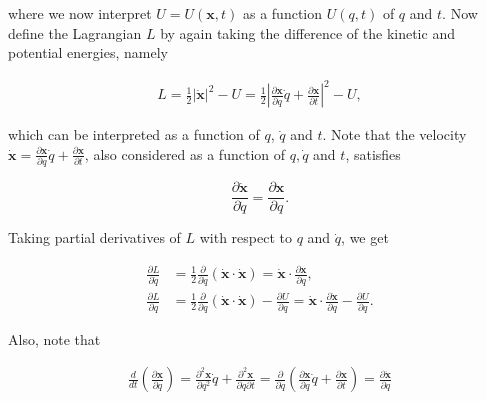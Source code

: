 \documentclass[11pt]{report}
\theoremstyle{plain}
\theoremstyle{definition}
\begin{document}
\noindent where we now interpret $U=U(\mathbf{x},t)$ as a
function $U(q,t)$ of $q$ and $t$. Now define the
Lagrangian $L$ by again taking the difference of the
kinetic and potential energies, namely

\begin{align*}
L = \tfrac12 |\dot{\mathbf{x}}|^2 - U
= \tfrac12 \left| \frac{\partial \mathbf{x}}{\partial q} \dot{q} + \frac{\partial \mathbf{x}}{\partial t} \right|^2 - U,
\end{align*}

\noindent which can be interpreted as a function of $q$,
$\dot{q}$ and $t$. Note that the velocity
$\dot{\mathbf{x}}=\frac{\partial \mathbf{x}}{\partial
q} \dot{q} + \frac{\partial \mathbf{x}}{\partial t}$,
also considered as a function of $q, \dot{q}$ and $t$,
satisfies

\[
\frac{\partial \dot{\mathbf{x}}}{\partial \dot{q}} = \frac{\partial \mathbf{x}}{\partial q}.
\]

\noindent Taking partial derivatives of $L$ with respect to $q$
and $\dot{q}$, we get

\begin{equation*} \tag{10}\label{eq:curveeq2}
\begin{split}
\frac{\partial L}{\partial \dot{q}} &=
\tfrac12 \frac{\partial }{\partial \dot{q}} \left( \dot{\mathbf{x}}\cdot \dot{\mathbf{x}} \right)
=
\dot{\mathbf{x}} \cdot \frac{\partial \mathbf{x}}{\partial q}, \\
\frac{\partial L}{\partial q} &=
\tfrac12 \frac{\partial }{\partial q} \left( \dot{\mathbf{x}}\cdot \dot{\mathbf{x}} \right) - \frac{\partial U}{\partial q}
=
\dot{\mathbf{x}}\cdot \frac{\partial \dot{\mathbf{x}}}{\partial q}-\frac{\partial U}{\partial q}.
\end{split}
\end{equation*}

\noindent Also, note that

\begin{equation*} \tag{11}\label{eq:curveeq3}
\begin{split}
\frac{d}{dt}\left(\frac{\partial \mathbf{x}}{\partial q}\right) = \frac{\partial ^2 \mathbf{x}}{\partial q^2}\dot{q}
+ \frac{\partial ^2 \mathbf{x}}{\partial q\partial t} = \frac{\partial }{\partial q}
\left( \frac{\partial \mathbf{x}}{\partial q}\dot{q}+\frac{\partial \mathbf{x}}{\partial t}
\right) = \frac{\partial \mathbf{\dot{x}}}{\partial q}
\end{split}
\end{equation*}
\end{document}
